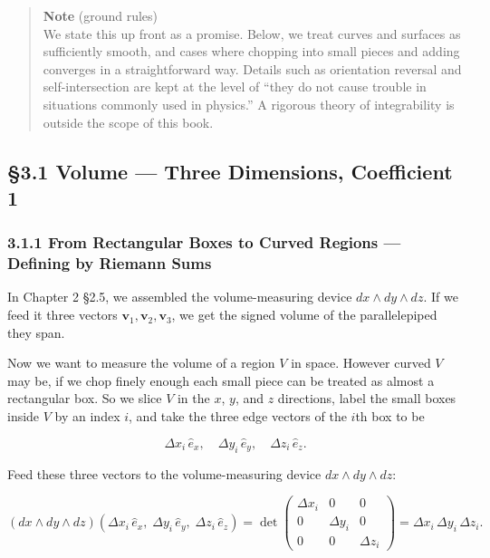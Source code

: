\documentclass[a4paper,12pt,openany]{book}
\begin{document}
\begin{quote}
\textbf{Note} (ground rules)\\
We state this up front as a promise. Below, we treat curves and surfaces
as sufficiently smooth, and cases where chopping into small pieces and
adding converges in a straightforward way. Details such as orientation
reversal and self-intersection are kept at the level of ``they do not
cause trouble in situations commonly used in physics.'' A rigorous
theory of integrability is outside the scope of this book.
\end{quote}

\par\vspace{0.35em}\par

\hypertarget{volume-three-dimensions-coefficient-1}{%
\subsection{§3.1 Volume — Three Dimensions, Coefficient
1}\label{volume-three-dimensions-coefficient-1}}

\hypertarget{from-rectangular-boxes-to-curved-regions-defining-by-riemann-sums}{%
\subsubsection{3.1.1 From Rectangular Boxes to Curved Regions —
Defining by Riemann
Sums}\label{from-rectangular-boxes-to-curved-regions-defining-by-riemann-sums}}

In Chapter 2 §2.5, we assembled the volume-measuring device
\(dx \wedge dy \wedge dz\). If we feed it three vectors
\(\mathbf{v}_1, \mathbf{v}_2, \mathbf{v}_3\), we get the signed volume
of the parallelepiped they span.

Now we want to measure the volume of a region \(V\) in space. However
curved \(V\) may be, if we chop finely enough each small piece can be
treated as almost a rectangular box. So we slice \(V\) in the \(x\),
\(y\), and \(z\) directions, label the small boxes inside \(V\) by an
index \(i\), and take the three edge vectors of the \(i\)th box to be

\[\Delta x_i\,\hat{e}_x,\quad \Delta y_i\,\hat{e}_y,\quad \Delta z_i\,\hat{e}_z.\]

Feed these three vectors to the volume-measuring device
\(dx \wedge dy \wedge dz\):

\[(dx \wedge dy \wedge dz)(\Delta x_i\,\hat{e}_x,\; \Delta y_i\,\hat{e}_y,\; \Delta z_i\,\hat{e}_z) = \det\begin{pmatrix}\Delta x_i & 0 & 0 \\ 0 & \Delta y_i & 0 \\ 0 & 0 & \Delta z_i\end{pmatrix} = \Delta x_i\,\Delta y_i\,\Delta z_i.\]
\end{document}
